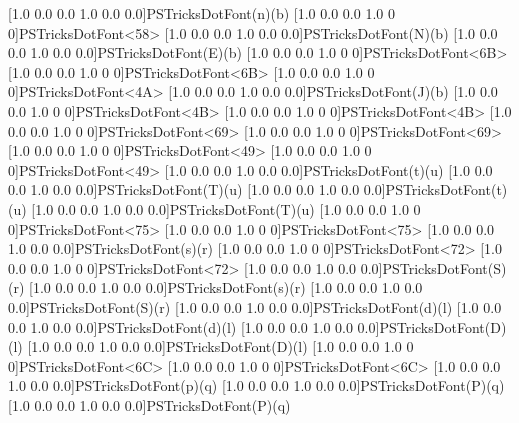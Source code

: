   [1.0 0.0 0.0 1.0 0.0 0.0]{PSTricksDotFont}{(n)}{(b)}
  [1.0 0.0 0.0 1.0 0 0]{PSTricksDotFont}{<58>}
  [1.0 0.0 0.0 1.0 0.0 0.0]{PSTricksDotFont}{(N)}{(b)}
  [1.0 0.0 0.0 1.0 0.0 0.0]{PSTricksDotFont}{(E)}{(b)}
%
  [1.0 0.0 0.0 1.0 0 0]{PSTricksDotFont}{<6B>}
  [1.0 0.0 0.0 1.0 0 0]{PSTricksDotFont}{<6B>}
  [1.0 0.0 0.0 1.0 0 0]{PSTricksDotFont}{<4A>}
  [1.0 0.0 0.0 1.0 0.0 0.0]{PSTricksDotFont}{(J)}{(b)}
  [1.0 0.0 0.0 1.0 0 0]{PSTricksDotFont}{<4B>}
  [1.0 0.0 0.0 1.0 0 0]{PSTricksDotFont}{<4B>}
%
  [1.0 0.0 0.0 1.0 0 0]{PSTricksDotFont}{<69>}
  \newpsfontdot{|}[1.0 0.0 0.0 1.0 0 0]{PSTricksDotFont}{<69>}
  [1.0 0.0 0.0 1.0 0 0]{PSTricksDotFont}{<49>}
  [1.0 0.0 0.0 1.0 0 0]{PSTricksDotFont}{<49>}
%
  [1.0 0.0 0.0 1.0 0.0 0.0]{PSTricksDotFont}{(t)}{(u)}
  [1.0 0.0 0.0 1.0 0.0 0.0]{PSTricksDotFont}{(T)}{(u)}
  [1.0 0.0 0.0 1.0 0.0 0.0]{PSTricksDotFont}{(t)}{(u)}
  [1.0 0.0 0.0 1.0 0.0 0.0]{PSTricksDotFont}{(T)}{(u)}
  [1.0 0.0 0.0 1.0 0 0]{PSTricksDotFont}{<75>}
  [1.0 0.0 0.0 1.0 0 0]{PSTricksDotFont}{<75>}
%
  [1.0 0.0 0.0 1.0 0.0 0.0]{PSTricksDotFont}{(s)}{(r)}
  [1.0 0.0 0.0 1.0 0 0]{PSTricksDotFont}{<72>}
  [1.0 0.0 0.0 1.0 0 0]{PSTricksDotFont}{<72>}
  [1.0 0.0 0.0 1.0 0.0 0.0]{PSTricksDotFont}{(S)}{(r)}
  [1.0 0.0 0.0 1.0 0.0 0.0]{PSTricksDotFont}{(s)}{(r)}
  [1.0 0.0 0.0 1.0 0.0 0.0]{PSTricksDotFont}{(S)}{(r)}
%
  [1.0 0.0 0.0 1.0 0.0 0.0]{PSTricksDotFont}{(d)}{(l)}
  [1.0 0.0 0.0 1.0 0.0 0.0]{PSTricksDotFont}{(d)}{(l)}
  [1.0 0.0 0.0 1.0 0.0 0.0]{PSTricksDotFont}{(D)}{(l)}
  [1.0 0.0 0.0 1.0 0.0 0.0]{PSTricksDotFont}{(D)}{(l)}
  [1.0 0.0 0.0 1.0 0 0]{PSTricksDotFont}{<6C>}
  [1.0 0.0 0.0 1.0 0 0]{PSTricksDotFont}{<6C>}
%
  [1.0 0.0 0.0 1.0 0.0 0.0]{PSTricksDotFont}{(p)}{(q)}  
  [1.0 0.0 0.0 1.0 0.0 0.0]{PSTricksDotFont}{(P)}{(q)}
  [1.0 0.0 0.0 1.0 0.0 0.0]{PSTricksDotFont}{(P)}{(q)}
